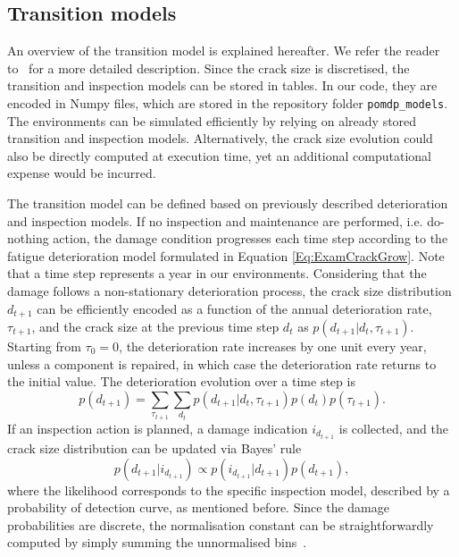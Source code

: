 \subsection{Transition models}
An overview of the transition model is explained hereafter.
We refer the reader to~\citep{morato2022syst} for a more detailed description.
Since the crack size is discretised, the transition and inspection models can be stored in tables.
In our code, they are encoded in Numpy files, which are stored in the repository folder \texttt{pomdp\_models}.
The environments can be simulated efficiently by relying on already stored transition and inspection models.
Alternatively, the crack size evolution could also be directly computed at execution time, yet an additional computational expense would be incurred.

The transition model can be defined based on previously described deterioration and inspection models. 
If no inspection and maintenance are performed, i.e. do-nothing action, the damage condition progresses each time step according to the fatigue deterioration model formulated in Equation \ref{Eq:ExamCrackGrow}.
Note that a time step represents a year in our environments.
Considering that the damage follows a non-stationary deterioration process, the crack size distribution $d_{t+1}$ can be efficiently encoded as a function of the annual deterioration rate, $\tau_{t+1}$, and the crack size at the previous time step $d_{t}$ as $p(d_{t+1}|d_t,\tau_{t+1})$. 
Starting from $\tau_{0}=0$, the deterioration rate increases by one unit every year, unless a component is repaired, in which case the deterioration rate returns to the initial value. 
The deterioration evolution over a time step is
\begin{equation} \label{eq:ex_pod2}
    p(d_{t+1}) =  \sum_{\tau_{t+1}} \sum_{d_t} p(d_{t+1}|d_t,\tau_{t+1}) p(d_{t}) p(\tau_{t+1}) .
\end{equation}
If an inspection action is planned, a damage indication $i_{d_{t+1}}$ is collected, and the crack size distribution can be updated via Bayes' rule
\begin{equation} \label{eq:ex_pod3}
    p(d_{t+1}|i_{d_{t+1}}) \propto  p(i_{d_{t+1}}|d_{t+1}) p(d_{t+1})   ,
\end{equation}
where the likelihood corresponds to the specific inspection model, described by a probability of detection curve, as mentioned before.
Since the damage probabilities are discrete, the normalisation constant can be straightforwardly computed by simply summing the unnormalised bins~\citep{morato2022optimal}.

